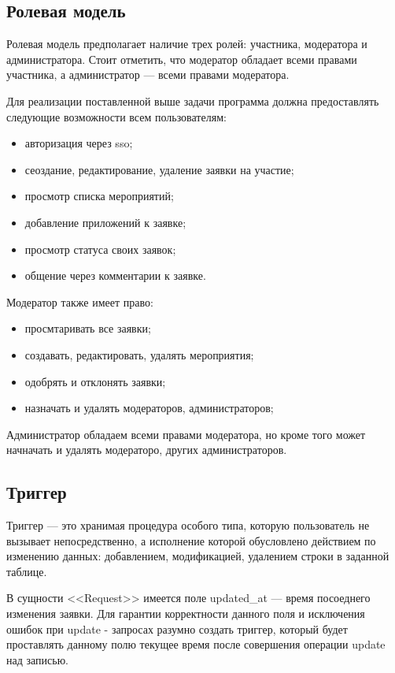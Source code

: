 \subsection{Ролевая модель}

Ролевая модель предполагает наличие трех ролей: участника, модератора и администратора. Стоит отметить, что модератор обладает всеми правами участника, а администратор --- всеми правами модератора.

Для реализации поставленной выше задачи программа должна предоставлять следующие возможности всем пользователям:
\begin{itemize}[label=---]
	\item авторизация через sso;
	\item сеоздание, редактирование, удаление заявки на участие;
	\item просмотр списка мероприятий;
	\item добавление приложений к заявке;
	\item просмотр статуса своих заявок;
	\item общение через комментарии к заявке.
\end{itemize}

Модератор также имеет право:
\begin{itemize}[label=---]
	\item просмтаривать все заявки;
	\item создавать, редактировать, удалять мероприятия;
	\item одобрять и отклонять заявки;
	\item назначать и удалять модераторов, администраторов;
\end{itemize}

Администратор обладаем всеми правами модератора, но кроме того может начначать и удалять модераторо, других администраторов.

\subsection{Триггер}

Триггер — это хранимая процедура особого типа, которую пользователь не вызывает непосредственно, а исполнение которой обусловлено действием по изменению данных: добавлением, модификацией, удалением строки в заданной таблице.

В сущности <<Request>> имеется поле updated{\_}at --- время посоеднего изменения заявки. Для гарантии корректности данного поля и исключения ошибок при update - запросах разумно создать триггер, который будет проставлять данному полю текущее время после совершения операции update над записью.

